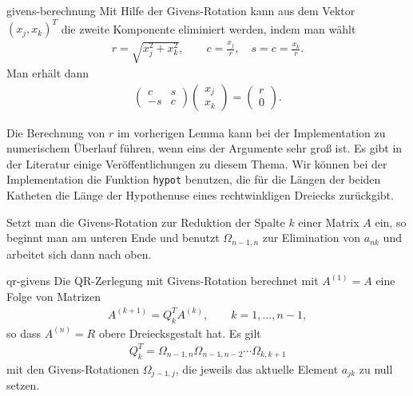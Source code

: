 \begin{Lemma}{givens-berechnung}
  Mit Hilfe der Givens-Rotation kann aus dem Vektor $(x_j,x_k)^T$ die
  zweite Komponente eliminiert werden, indem man wählt
  \begin{gather}
    r = \sqrt{x_j^2+x_k^2},\qquad
    c = \frac{x_j}r,\quad s=c = \frac{x_k}r.
  \end{gather}
  Man erhält dann
  \begin{gather}
    \begin{pmatrix}
      c & s \\ -s & c
    \end{pmatrix}
    \begin{pmatrix}
      x_j\\x_k
    \end{pmatrix}
    =
    \begin{pmatrix}
      r\\0
    \end{pmatrix}
    .
  \end{gather}
\end{Lemma}

\begin{remark}
  Die Berechnung von $r$ im vorherigen Lemma kann bei der
  Implementation zu numerischem Überlauf führen, wenn eins der
  Argumente sehr groß ist. Es gibt in der Literatur einige
  Veröffentlichungen zu diesem Thema. Wir können bei der
  Implementation die Funktion \lstinline!hypot! benutzen, die für die
  Längen der beiden Katheten die Länge der Hypothenuse eines
  rechtwinkligen Dreiecks zurückgibt.
\end{remark}



\begin{remark}
  Setzt man die Givens-Rotation zur Reduktion der Spalte $k$ einer
  Matrix $A$ ein, so beginnt man am unteren Ende und benutzt
  $\Omega_{n-1,n}$ zur Elimination von $a_{nk}$ und arbeitet sich dann nach oben.
\end{remark}

\begin{Lemma}{qr-givens}
  Die QR-Zerlegung mit Givens-Rotation berechnet mit $A^{(1)} = A$ eine Folge von Matrizen
  \begin{gather}
    A^{(k+1)} = Q_k^T A^{(k)}, \qquad k=1,\dots,n-1,
  \end{gather}
  so dass $A^{(n)}=R$ obere Dreiecksgestalt hat. Es gilt
  \begin{gather}
    Q_k^T = \Omega_{n-1,n}\Omega_{n-1,n-2}\cdots\Omega_{k,k+1}
  \end{gather}
  mit den Givens-Rotationen $\Omega_{j-1,j}$, die jeweils das aktuelle
  Element $a_{jk}$ zu null setzen.
\end{Lemma}

